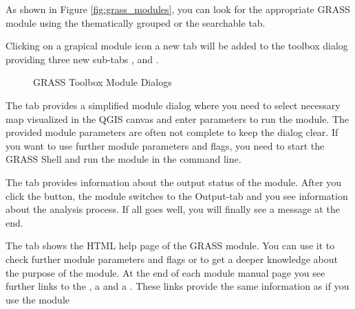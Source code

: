 As shown in Figure \ref{fig:grass_modules}, you can look for the appropriate GRASS module 
using the thematically grouped  or the searchable  tab. 

Clicking on a grapical module icon a new tab will be added to the toolbox dialog 
providing three new sub-tabs ,  and .


\begin{figure}[h]
\centering
\caption{GRASS Toolbox Module Dialogs \nixcaption}\label{fig:grass_module_dialog}
   \goodgap
   \goodgap
\end{figure}


The  tab provides a simplified module dialog where you need to 
select necessary map visualized in the QGIS canvas and enter parameters to run 
the module. The provided module parameters are often not complete to keep the dialog 
clear. If you want to use further module parameters and flags, you need to start the 
GRASS Shell and run the module in the command line.


The  tab provides information about the output status of the module. After 
you click the  button, the module switches to the Output-tab and you see 
information about the analysis process. If all goes well, you will finally see a 
 message at the end.


The  tab shows the HTML help page of the GRASS module. You can use it to 
check further module parameters and flags or to get a deeper knowledge about the 
purpose of the module. At the end of each module manual page you see further links to 
the , a  and a . 
These links provide the same information as if you use the module  

\begin{Tip}\caption{\textsc{Display results immediately}}
\end{Tip} 


